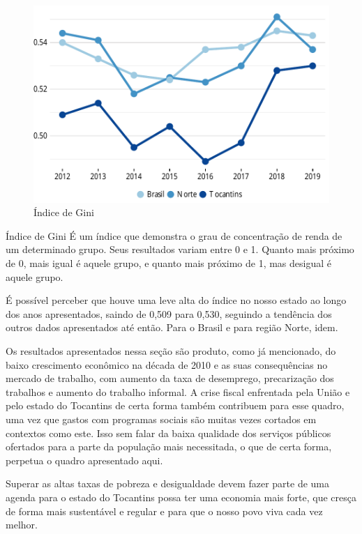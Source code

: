 \begin{figure}[h]
	\caption{Índice de Gini}
	\includegraphics{fig/gini.pdf}
\end{figure}
\begin{smbox}[label={labelbox},nameref={Índice de Gini}]{Índice de Gini}
	É um índice que demonstra o grau de concentração de renda de um determinado grupo. Seus resultados variam entre 0 e 1. Quanto mais próximo de 0, mais igual é aquele grupo, e quanto mais próximo de 1, mas desigual é aquele grupo.
\end{smbox}
\par É possível perceber que houve uma leve alta do índice no nosso estado ao longo dos anos apresentados, saindo de 0,509 para 0,530, seguindo a tendência dos outros dados apresentados até então. Para o Brasil e para região Norte, idem. 
\par Os resultados apresentados nessa seção são produto, como já mencionado, do baixo crescimento econômico na década de 2010 e as suas consequências no mercado de trabalho, com aumento da taxa de desemprego, precarização dos trabalhos e aumento do trabalho informal. A crise fiscal enfrentada pela União e pelo estado do Tocantins de certa forma também contribuem para esse quadro, uma vez que gastos com programas sociais são muitas vezes cortados em contextos como este. Isso sem falar da baixa qualidade dos serviços públicos ofertados para a parte da população mais necessitada, o que de certa forma, perpetua o quadro apresentado aqui.
\par Superar as altas taxas de pobreza e desigualdade devem fazer parte de uma agenda para o estado do Tocantins possa ter uma economia mais forte, que cresça de forma mais sustentável e regular e para que o nosso povo viva cada vez melhor.  
